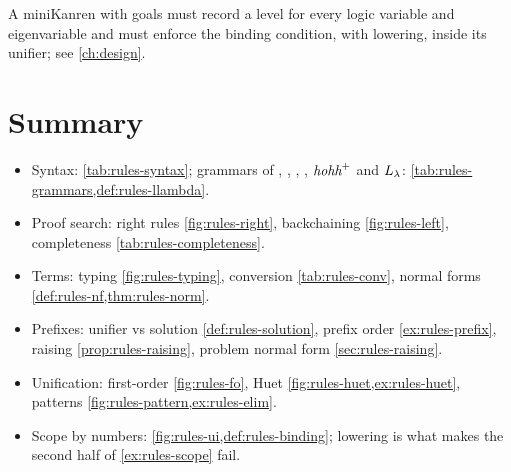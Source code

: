 \begin{kanren}
A miniKanren with  goals must record a level for every logic variable and eigenvariable and must enforce the binding condition, with lowering, inside its unifier; see \cref{ch:design}.
\end{kanren}

\section{Summary}\label{sec:rules-summary}

\begin{itemize}[nosep]
\item Syntax: \cref{tab:rules-syntax}; grammars of \fohc, \fohh, \hohc, \hohh, $\textit{hohh}^+$ and $L_\lambda$: \cref{tab:rules-grammars,def:rules-llambda}.
\item Proof search: right rules \cref{fig:rules-right}, backchaining \cref{fig:rules-left}, completeness \cref{tab:rules-completeness}.
\item Terms: typing \cref{fig:rules-typing}, conversion \cref{tab:rules-conv}, normal forms \cref{def:rules-nf,thm:rules-norm}.
\item Prefixes: unifier vs solution \cref{def:rules-solution}, prefix order \cref{ex:rules-prefix}, raising \cref{prop:rules-raising}, problem normal form \cref{sec:rules-raising}.
\item Unification: first-order \cref{fig:rules-fo}, Huet \cref{fig:rules-huet,ex:rules-huet}, patterns \cref{fig:rules-pattern,ex:rules-elim}.
\item Scope by numbers: \cref{fig:rules-ui,def:rules-binding}; lowering is what makes the second half of \cref{ex:rules-scope} fail.
\end{itemize}
